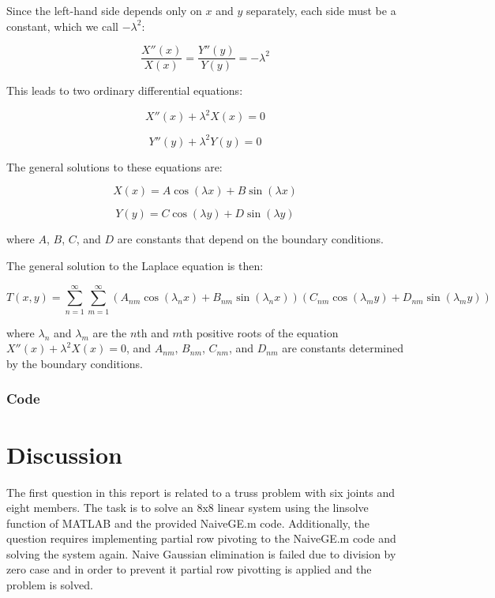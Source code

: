 \documentclass[12pt, a4paper]{article}
\begin{document}
Since the left-hand side depends only on $x$ and $y$ separately, each side must be a constant, which we call $-\lambda^2$:

\begin{equation}
\frac{X''(x)}{X(x)} = \frac{Y''(y)}{Y(y)} = -\lambda^2
\end{equation}

This leads to two ordinary differential equations:

\begin{equation}
X''(x) + \lambda^2 X(x) = 0
\end{equation}

\begin{equation}
Y''(y) + \lambda^2 Y(y) = 0
\end{equation}

The general solutions to these equations are:

\begin{equation}
X(x) = A\cos(\lambda x) + B\sin(\lambda x)
\end{equation}

\begin{equation}
Y(y) = C\cos(\lambda y) + D\sin(\lambda y)
\end{equation}

where $A$, $B$, $C$, and $D$ are constants that depend on the boundary conditions.

The general solution to the Laplace equation is then:

\begin{equation}
T(x,y) = \sum_{n=1}^\infty \sum_{m=1}^\infty (A_{nm}\cos(\lambda_n x) + B_{nm}\sin(\lambda_n x))(C_{nm}\cos(\lambda_m y) + D_{nm}\sin(\lambda_m y))
\end{equation}

where $\lambda_n$ and $\lambda_m$ are the $n$th and $m$th positive roots of the equation $X''(x) + \lambda^2 X(x) = 0$, and $A_{nm}$, $B_{nm}$, $C_{nm}$, and $D_{nm}$ are constants determined by the boundary conditions.

\subsubsection{Code}


\newpage
\section{Discussion}
The first question in this report is related to a truss problem with six joints and eight members. The task is to solve an 8x8 linear system using the linsolve function of MATLAB and the provided NaiveGE.m code. Additionally, the question requires implementing partial row pivoting to the NaiveGE.m code and solving the system again. Naive Gaussian elimination is failed due to division by zero case and in order to prevent it partial row pivotting is applied and the problem is solved.
\end{document}
